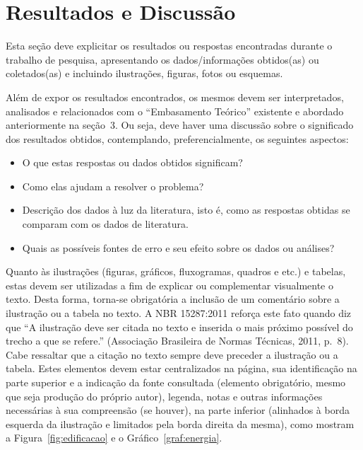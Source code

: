 \documentclass[10pt,a4paper]{article}
\begin{document}
\section{Resultados e Discussão}
Esta seção deve explicitar os resultados ou respostas encontradas durante o trabalho de pesquisa, apresentando os dados/informações obtidos(as) ou coletados(as) e incluindo ilustrações, figuras, fotos ou esquemas.

\vspace{\baselineskip}
Além de expor os resultados encontrados, os mesmos devem ser interpretados, analisados e relacionados com o ``Embasamento Teórico'' existente e abordado anteriormente na seção~3. Ou seja, deve haver uma discussão sobre o significado dos resultados obtidos, contemplando, preferencialmente, os seguintes aspectos:
\begin{itemize}
  \item O que estas respostas ou dados obtidos significam?
  \item Como elas ajudam a resolver o problema?
  \item Descrição dos dados à luz da literatura, isto é, como as respostas obtidas se comparam com os dados de literatura.
  \item Quais as possíveis fontes de erro e seu efeito sobre os dados ou análises?
\end{itemize}

\vspace{\baselineskip}
Quanto às ilustrações (figuras, gráficos, fluxogramas, quadros e etc.) e tabelas, estas devem ser utilizadas a fim de explicar ou complementar visualmente o texto. Desta forma, torna-se obrigatória a inclusão de um comentário sobre a ilustração ou a tabela no texto. A NBR 15287:2011 reforça este fato quando diz que ``A ilustração deve ser citada no texto e inserida o mais próximo possível do trecho a que se refere.'' (Associação Brasileira de Normas Técnicas, 2011, p.~8). Cabe ressaltar que a citação no texto sempre deve preceder a ilustração ou a tabela. Estes elementos devem estar centralizados na página, sua identificação na parte superior e a indicação da fonte consultada (elemento obrigatório, mesmo que seja produção do próprio autor), legenda, notas e outras informações necessárias à sua compreensão (se houver), na parte inferior (alinhados à borda esquerda da ilustração e limitados pela borda direita da mesma), como mostram a Figura~\ref{fig:edificacao} e o Gráfico~\ref{graf:energia}.
\end{document}
